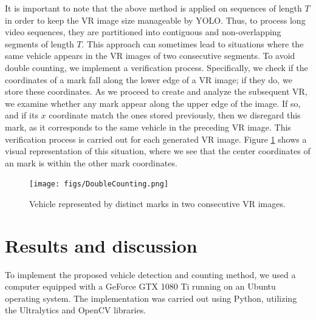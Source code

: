 \documentclass[10pt,conference]{IEEEtran}
\begin{document}

It is important to note that the above method is applied on sequences of length $T$ in order to keep the VR image size manageable by YOLO. Thus, to process long video sequences, they are partitioned into contiguous and non-overlapping segments of length $T$.
This approach can sometimes lead to situations where the same vehicle appears in the VR images of two consecutive segments. %
To avoid double counting, we implement a verification process. Specifically, we check if the coordinates of a mark fall along the lower edge of a VR image; if they do, we store these coordinates. As we proceed to create and analyze the subsequent VR, we examine whether any mark appear along the upper edge of the image. 
If so, and if its $x$ coordinate match the ones stored previously, then we disregard this mark, as it corresponds to the same vehicle in the preceding VR image. This verification process is carried out for each generated VR image. Figure \ref{fig:double-count} shows a visual representation of this situation, where we see that the center coordinates of an mark is within the other mark coordinates. 

\begin{figure}[htp]
    \centering
    \texttt{[image: figs/DoubleCounting.png]}
    \caption{Vehicle represented by distinct marks in two consecutive VR images.}
    \label{fig:double-count}
\end{figure}

\section{Results and discussion}
To implement the proposed vehicle detection and counting method, we used a computer equipped with a GeForce GTX 1080 Ti running on an Ubuntu operating system. The implementation was carried out using Python, utilizing the Ultralytics and OpenCV libraries.
\end{document}
